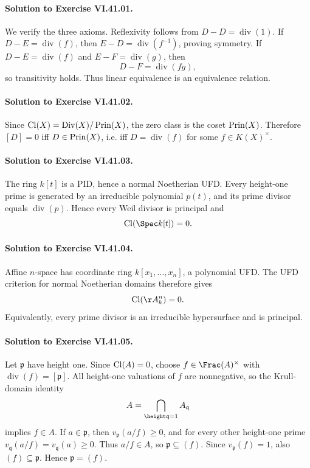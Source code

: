 
\paragraph{Solution to Exercise VI.41.01.}
We verify the three axioms. Reflexivity follows from \(D-D=\operatorname{div}(1)\). If
\(D-E=\operatorname{div}(f)\), then \(E-D=\operatorname{div}(f^{-1})\), proving symmetry.
If \(D-E=\operatorname{div}(f)\) and \(E-F=\operatorname{div}(g)\), then
\[
D-F=\operatorname{div}(fg),
\]
so transitivity holds. Thus linear equivalence is an equivalence relation.

\paragraph{Solution to Exercise VI.41.02.}
Since \(\operatorname{Cl}(X)=\operatorname{Div}(X)/\operatorname{Prin}(X)\), the zero class is the coset \(\operatorname{Prin}(X)\).
Therefore \([D]=0\) iff \(D\in\operatorname{Prin}(X)\), i.e. iff \(D=\operatorname{div}(f)\) for some
\(f\in K(X)^\times\).

\paragraph{Solution to Exercise VI.41.03.}
The ring \(k[t]\) is a PID, hence a normal Noetherian UFD. Every height-one prime is
generated by an irreducible polynomial \(p(t)\), and its prime divisor equals
\(\operatorname{div}(p)\). Hence every Weil divisor is principal and
\[
\Cl(\Spec k[t])=0.
\]

\paragraph{Solution to Exercise VI.41.04.}
Affine \(n\)-space has coordinate ring \(k[x_1,\ldots,x_n]\), a polynomial UFD.
The UFD criterion for normal Noetherian domains therefore gives
\[
\Cl(\AA^n_k)=0.
\]
Equivalently, every prime divisor is an irreducible hypersurface and is principal.

\paragraph{Solution to Exercise VI.41.05.}
Let \(\mathfrak p\) have height one. Since \(\operatorname{Cl}(A)=0\), choose
\(f\in\Frac(A)^\times\) with \(\operatorname{div}(f)=[\mathfrak p]\).
All height-one valuations of \(f\) are nonnegative, so the Krull-domain identity
\[
A=\bigcap_{\height\mathfrak q=1}A_{\mathfrak q}
\]
implies \(f\in A\). If \(a\in\mathfrak p\), then
\(v_{\mathfrak p}(a/f)\ge0\), and for every other height-one prime
\(v_{\mathfrak q}(a/f)=v_{\mathfrak q}(a)\ge0\). Thus \(a/f\in A\), so
\(\mathfrak p\subseteq(f)\). Since \(v_{\mathfrak p}(f)=1\), also \((f)\subseteq\mathfrak p\).
Hence \(\mathfrak p=(f)\).

